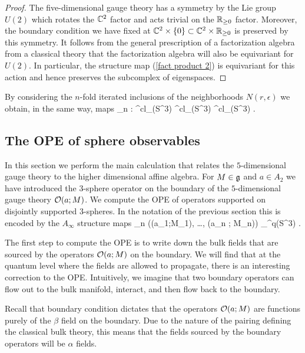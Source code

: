 \begin{proof}
The five-dimensional gauge theory has a symmetry by the Lie group $U(2)$ which rotates the $\mathbb C^2$ factor and acts trivial on the $\mathbb R_{\geq 0}$ factor. 
Moreover, the boundary condition we have fixed at $\mathbb C^2 \times \{0\} \subset \mathbb C^2 \times \mathbb R_{\geq 0}$ is preserved by this symmetry.
It follows from the general prescription of a factorization algebra from a classical theory that the factorization algebra will also be equivariant for $U(2)$. 
In particular, the structure map (\ref{fact product 2}) is equivariant for this action and hence preserves the subcomplex of eigenspaces. 
\end{proof}

By considering the $n$-fold iterated inclusions of the neighborhoods $N(r, \epsilon)$ we obtain, in the same way, maps
\ben 
\mu_n : \Obs^{cl}_{\partial}(S^3) \tensor \cdots \tensor \Obs^{cl}_{\partial}(S^3) \to \Obs^{cl}_{\partial}(S^3) .
\een

\subsection{The OPE of sphere observables}

In this section we perform the main calculation that relates the $5$-dimensional gauge theory to the higher dimensional affine algebra. 
For $M \in \mathfrak g$ and $a \in A_2$ we have introduced the $3$-sphere operator on the boundary of the $5$-dimensional gauge theory $\mathcal O(a ; M)$.
We compute the OPE of operators supported on disjointly supported $3$-spheres. 
In the notation of the previous section this is encoded by the $A_\infty$ structure maps
\ben
\mu_n (\cO(a_1;M_1), \ldots, \cO(a_n ; M_n)) \in \Obs_\partial^{q}(S^3) .
\een 

The first step to compute the OPE is to write down the bulk fields that are sourced by the operators $\mathcal O(a;M)$ on the boundary. 
We will find that at the quantum level where the fields are allowed to propagate, there is an interesting correction to the OPE. 
Intuitively, we imagine that two boundary operators can flow out to the bulk manifold, interact, and then flow back to the boundary. 

Recall that boundary condition dictates that the operators $\mathcal O(a;M)$ are functions purely of the $\beta$ field on the boundary. 
Due to the nature of the pairing defining the classical bulk theory, this means that the fields sourced by the boundary operators will be $\alpha$ fields. 

